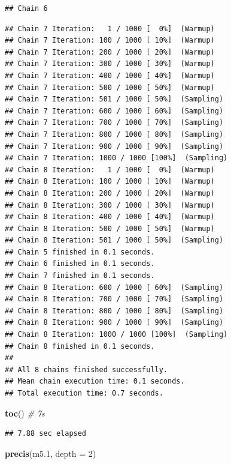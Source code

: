 \documentclass[
]{book}
\newenvironment{Shaded}{\begin{snugshade}}{\end{snugshade}}
\newcommand{\AttributeTok}[1]{\textcolor[rgb]{0.13,0.29,0.53}{#1}}
\newcommand{\CommentTok}[1]{\textcolor[rgb]{0.56,0.35,0.01}{\textit{#1}}}
\newcommand{\DecValTok}[1]{\textcolor[rgb]{0.00,0.00,0.81}{#1}}
\newcommand{\FloatTok}[1]{\textcolor[rgb]{0.00,0.00,0.81}{#1}}
\newcommand{\FunctionTok}[1]{\textcolor[rgb]{0.13,0.29,0.53}{\textbf{#1}}}
\newcommand{\NormalTok}[1]{#1}
\begin{document}
\begin{verbatim}
## Chain 6
\end{verbatim}

\begin{verbatim}
## Chain 7 Iteration:   1 / 1000 [  0%]  (Warmup) 
## Chain 7 Iteration: 100 / 1000 [ 10%]  (Warmup) 
## Chain 7 Iteration: 200 / 1000 [ 20%]  (Warmup) 
## Chain 7 Iteration: 300 / 1000 [ 30%]  (Warmup) 
## Chain 7 Iteration: 400 / 1000 [ 40%]  (Warmup) 
## Chain 7 Iteration: 500 / 1000 [ 50%]  (Warmup) 
## Chain 7 Iteration: 501 / 1000 [ 50%]  (Sampling) 
## Chain 7 Iteration: 600 / 1000 [ 60%]  (Sampling) 
## Chain 7 Iteration: 700 / 1000 [ 70%]  (Sampling) 
## Chain 7 Iteration: 800 / 1000 [ 80%]  (Sampling) 
## Chain 7 Iteration: 900 / 1000 [ 90%]  (Sampling) 
## Chain 7 Iteration: 1000 / 1000 [100%]  (Sampling) 
## Chain 8 Iteration:   1 / 1000 [  0%]  (Warmup) 
## Chain 8 Iteration: 100 / 1000 [ 10%]  (Warmup) 
## Chain 8 Iteration: 200 / 1000 [ 20%]  (Warmup) 
## Chain 8 Iteration: 300 / 1000 [ 30%]  (Warmup) 
## Chain 8 Iteration: 400 / 1000 [ 40%]  (Warmup) 
## Chain 8 Iteration: 500 / 1000 [ 50%]  (Warmup) 
## Chain 8 Iteration: 501 / 1000 [ 50%]  (Sampling) 
## Chain 5 finished in 0.1 seconds.
## Chain 6 finished in 0.1 seconds.
## Chain 7 finished in 0.1 seconds.
## Chain 8 Iteration: 600 / 1000 [ 60%]  (Sampling) 
## Chain 8 Iteration: 700 / 1000 [ 70%]  (Sampling) 
## Chain 8 Iteration: 800 / 1000 [ 80%]  (Sampling) 
## Chain 8 Iteration: 900 / 1000 [ 90%]  (Sampling) 
## Chain 8 Iteration: 1000 / 1000 [100%]  (Sampling) 
## Chain 8 finished in 0.1 seconds.
## 
## All 8 chains finished successfully.
## Mean chain execution time: 0.1 seconds.
## Total execution time: 0.7 seconds.
\end{verbatim}

\begin{Shaded}
\begin{Highlighting}[]
\FunctionTok{toc}\NormalTok{() }\CommentTok{\# 7s}
\end{Highlighting}
\end{Shaded}

\begin{verbatim}
## 7.88 sec elapsed
\end{verbatim}

\begin{Shaded}
\begin{Highlighting}[]
\FunctionTok{precis}\NormalTok{(m5}\FloatTok{.1}\NormalTok{, }\AttributeTok{depth =} \DecValTok{2}\NormalTok{)}
\end{Highlighting}
\end{Shaded}
\end{document}

